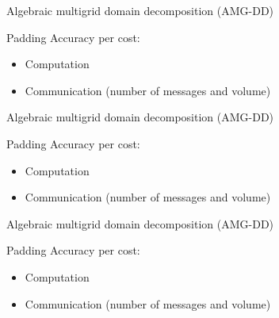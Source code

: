\documentclass[18pt,xcolor=table]{beamer}
\begin{document}
\begin{frame}{Algebraic multigrid domain decomposition (AMG-DD)}
\begin{block}{Padding}
Accuracy per cost:
\begin{itemize}
   \item Computation
   \item Communication (number of messages and volume)
\end{itemize}
\end{block}

\centering
\vspace{0.5 cm}

\end{frame}

\begin{frame}{Algebraic multigrid domain decomposition (AMG-DD)}
\begin{block}{Padding}
Accuracy per cost:
\begin{itemize}
   \item Computation
   \item Communication (number of messages and volume)
\end{itemize}
\end{block}

\centering
\vspace{0.5 cm}

\end{frame}

\begin{frame}{Algebraic multigrid domain decomposition (AMG-DD)}
\begin{block}{Padding}
Accuracy per cost:
\begin{itemize}
   \item Computation
   \item Communication (number of messages and volume)
\end{itemize}
\end{block}

\centering
\vspace{0.5 cm}

\end{frame}
\end{document}

